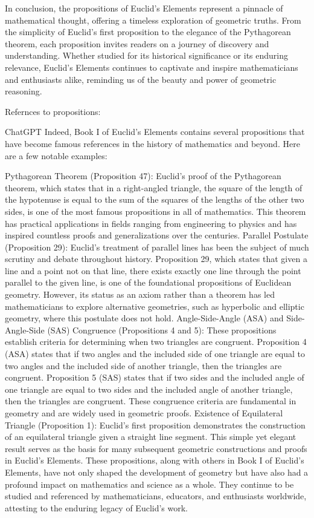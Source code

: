 In conclusion, the propositions of Euclid's Elements represent a pinnacle of mathematical thought, offering a timeless exploration of geometric truths. From the simplicity of Euclid's first proposition to the elegance of the Pythagorean theorem, each proposition invites readers on a journey of discovery and understanding. Whether studied for its historical significance or its enduring relevance, Euclid's Elements continues to captivate and inspire mathematicians and enthusiasts alike, reminding us of the beauty and power of geometric reasoning.


Refernces to propositions:


ChatGPT
Indeed, Book I of Euclid's Elements contains several propositions that have become famous references in the history of mathematics and beyond. Here are a few notable examples:

Pythagorean Theorem (Proposition 47): Euclid's proof of the Pythagorean theorem, which states that in a right-angled triangle, the square of the length of the hypotenuse is equal to the sum of the squares of the lengths of the other two sides, is one of the most famous propositions in all of mathematics. This theorem has practical applications in fields ranging from engineering to physics and has inspired countless proofs and generalizations over the centuries.
Parallel Postulate (Proposition 29): Euclid's treatment of parallel lines has been the subject of much scrutiny and debate throughout history. Proposition 29, which states that given a line and a point not on that line, there exists exactly one line through the point parallel to the given line, is one of the foundational propositions of Euclidean geometry. However, its status as an axiom rather than a theorem has led mathematicians to explore alternative geometries, such as hyperbolic and elliptic geometry, where this postulate does not hold.
Angle-Side-Angle (ASA) and Side-Angle-Side (SAS) Congruence (Propositions 4 and 5): These propositions establish criteria for determining when two triangles are congruent. Proposition 4 (ASA) states that if two angles and the included side of one triangle are equal to two angles and the included side of another triangle, then the triangles are congruent. Proposition 5 (SAS) states that if two sides and the included angle of one triangle are equal to two sides and the included angle of another triangle, then the triangles are congruent. These congruence criteria are fundamental in geometry and are widely used in geometric proofs.
Existence of Equilateral Triangle (Proposition 1): Euclid's first proposition demonstrates the construction of an equilateral triangle given a straight line segment. This simple yet elegant result serves as the basis for many subsequent geometric constructions and proofs in Euclid's Elements.
These propositions, along with others in Book I of Euclid's Elements, have not only shaped the development of geometry but have also had a profound impact on mathematics and science as a whole. They continue to be studied and referenced by mathematicians, educators, and enthusiasts worldwide, attesting to the enduring legacy of Euclid's work.



